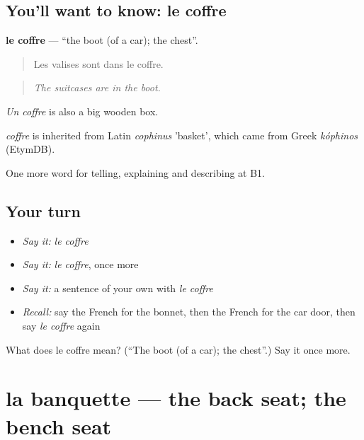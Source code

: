 \subsection*{You'll want to know: le coffre}
\textbf{le coffre} — \textquotedblleft{}the boot (of a car); the chest\textquotedblright{}.

\begin{quote}
Les valises sont dans le coffre.
\end{quote}

\begin{quote}
\emph{The suitcases are in the boot.}
\end{quote}

\emph{Un coffre} is also a big wooden box.

\begin{cousinweb}
\emph{coffre} is inherited from Latin \emph{cophinus} 'basket', which came from Greek \emph{kóphinos} (EtymDB).
\end{cousinweb}

\begin{grammarlens}[title={What you've built}]
One more word for telling, explaining and describing at B1.
\end{grammarlens}

\subsection*{Your turn}
\begin{itemize}
\raggedright
  \item \emph{Say it:} \emph{le coffre}
  \item \emph{Say it:} \emph{le coffre}, once more
  \item \emph{Say it:} a sentence of your own with \emph{le coffre}
  \item \emph{Recall:} say the French for the bonnet, then the French for the car door, then say \emph{le coffre} again
\end{itemize}

\begin{tcolorbox}[breakable,colback=teal!4,colframe=teal!35!black,title={Before you move on}]
What does le coffre mean? (\textquotedblleft{}The boot (of a car); the chest\textquotedblright{}.) Say it once more.
\end{tcolorbox}
\section[la banquette]{la banquette — the back seat; the bench seat}

